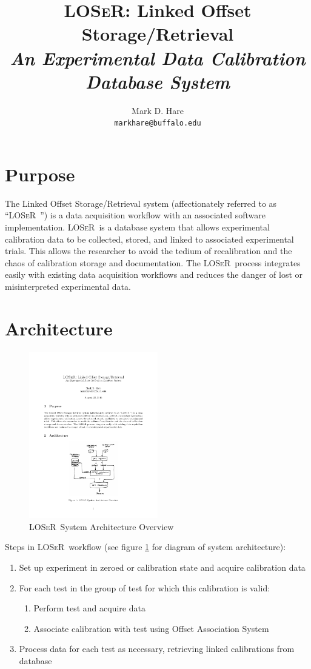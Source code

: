 \documentclass[11pt,letterpaper]{article}
\title{\textsc{LOSeR:} Linked Offset Storage/Retrieval \\ \large \textit{An Experimental Data Calibration Database System}}
\author{Mark D. Hare \\ \texttt{markhare@buffalo.edu}}
\newcommand{\loser}{\textsc{LOSeR\ }}
\begin{document}
\maketitle

\section{Purpose}
The Linked Offset Storage/Retrieval system (affectionately referred to as ``\loser'') is a data acquisition workflow with an associated software implementation. \loser is a database system that allows experimental calibration data to be collected, stored, and linked to associated experimental trials. This allows the researcher to avoid the tedium of recalibration and the chaos of calibration storage and documentation. The \loser process integrates easily with existing data acquisition workflows and reduces the danger of lost or misinterpreted experimental data.

\section{Architecture}

\begin{figure}[h]
\centering
\includegraphics[width=0.5\textwidth]{loser}
\caption{\loser System Architecture Overview}
\label{fig:arch}
\end{figure}

Steps in \loser workflow (see figure \ref{fig:arch} for diagram of system architecture):
\begin{enumerate}
\item Set up experiment in zeroed or calibration state and acquire calibration data
\item For each test in the group of test for which this calibration is valid:
\begin{enumerate}
\item Perform test and acquire data
\item Associate calibration with test using Offset Association System
\end{enumerate}
\item Process data for each test as necessary, retrieving linked calibrations from database
\end{enumerate}
\end{document}
